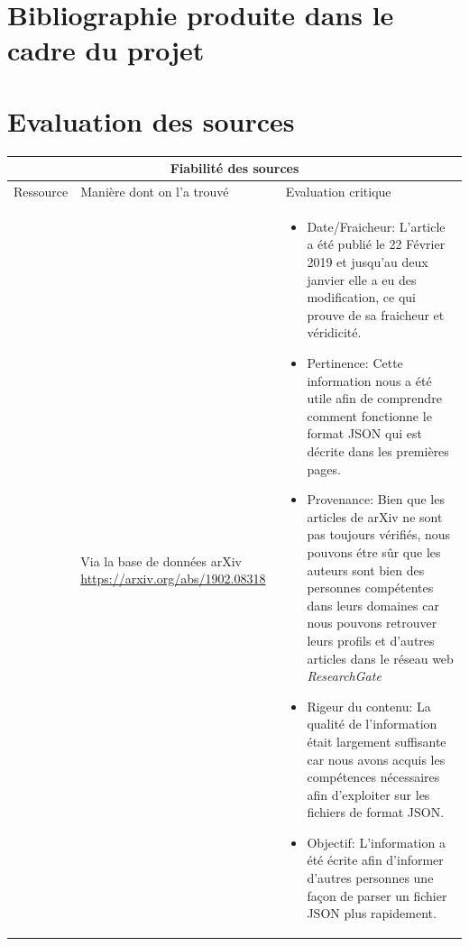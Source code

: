 \documentclass[french]{article}
\begin{document}
\section{Bibliographie produite dans le cadre du projet}





\section{Evaluation des sources}
\begin{tabular}{ |p{1.5cm}||p{6cm}|p{8cm}|  }
 \hline
 \multicolumn{3}{|c|}{Fiabilité des sources} \\
 \hline
 Ressource  & Manière dont on l'a trouvé & Evaluation critique\\
 \hline
 \cite{langdale_parsing_2019}   & Via la base de données arXiv \url{https://arxiv.org/abs/1902.08318} &
 
 \begin{itemize}
\item Date/Fraicheur: L'article a été publié le 22 Février 2019 et jusqu'au deux janvier elle a eu des modification, ce qui prouve de sa fraicheur et véridicité. 
\item Pertinence: Cette information nous a été utile afin de comprendre comment fonctionne le format JSON qui est décrite dans les premières pages. 
\item Provenance: Bien que les articles de arXiv ne sont pas toujours vérifiés, nous pouvons étre sûr que les auteurs sont bien des personnes compétentes dans leurs domaines car nous pouvons retrouver leurs profils et d'autres articles dans le réseau web \emph{ResearchGate}
\item Rigeur du contenu: La qualité de l'information était largement suffisante car nous avons acquis les compétences nécessaires afin d'exploiter sur les fichiers de format JSON. 
\item Objectif: L'information a été écrite afin d'informer d'autres personnes une façon de parser un fichier JSON plus rapidement. 
\newline
\end{itemize} \\


\end{tabular}
\end{document}
